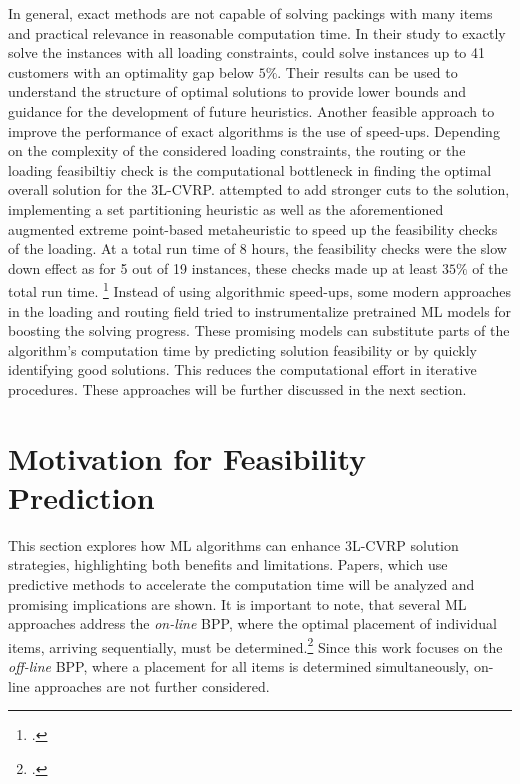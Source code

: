 In general, exact methods are not capable of solving packings with many items and practical relevance
in reasonable computation time. In their study to exactly solve the \gendreauDataSetText instances with all loading constraints,
\cite{tamke_branch-and-cut_2024} could solve instances up to 41 customers with an optimality
gap below $5 \%$. Their results can be used to understand the structure
of optimal solutions to provide lower bounds and guidance for the development of future
heuristics. Another feasible approach to improve
the performance of exact algorithms is the use of speed-ups. Depending on the complexity of
the considered loading constraints, the routing or the loading feasibiltiy check is the computational
bottleneck in finding the optimal overall solution for the \gls{3L-CVRP}. \textcite{tamke_branch-and-cut_2024} attempted to add
stronger cuts to the solution, implementing a set partitioning heuristic as well as the
aforementioned augmented extreme point-based metaheuristic to speed up the feasibility checks of the loading.
At a total run time of 8 hours, the feasibility
checks were the slow down effect as for 5 out of 19 instances, these checks made up at least $35\%$ of the total run time. \footcite[cf.][p.2]{tamke_branch-and-cut_2024}
Instead of using algorithmic speed-ups, some modern approaches in the loading and routing field tried
to instrumentalize pretrained \gls{ML} models for boosting the solving progress.
These promising models can substitute parts of the algorithm's computation time by predicting solution
feasibility or by quickly identifying good solutions. This reduces the computational effort
in iterative procedures. These approaches will be further discussed in the next section.

\section{Motivation for Feasibility Prediction}
\label{sec:motivation_feasibility_prediction}
This section explores how \gls{ML} algorithms can enhance \gls{3L-CVRP} solution strategies,
highlighting both benefits and limitations. Papers, which use predictive methods to accelerate the computation time
will be analyzed and promising implications are shown. It is important to note, that
several \gls{ML} approaches address the \textit{on-line} \gls{BPP}, where the optimal placement
of individual items, arriving sequentially, must be determined.\footcite[cf.][p.1]{ali_-line_2022}
Since this work focuses on the \textit{off-line} \gls{BPP}, where a placement for all items is determined
simultaneously, on-line approaches are not further considered.

